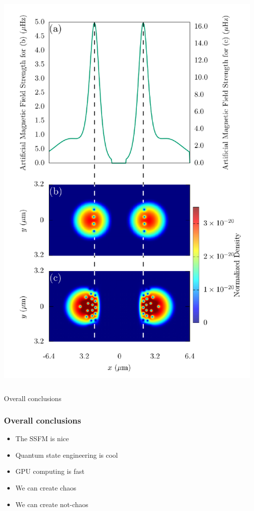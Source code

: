 \documentclass{beamer}
\begin{document}
\begin{frame}
\begin{columns}
\includegraphics[width=\linewidth]{../data/3d/vortex_line_all.pdf}
\end{columns}
\end{frame}


\begin{frame}
\center \huge Overall conclusions
\end{frame}

\begin{frame}
\frametitle{Overall conclusions}

\begin{itemize}
\item The SSFM is nice
\item Quantum state engineering is cool
\item GPU computing is fast
\item We can create chaos
\item We can create not-chaos
\end{itemize}
\end{frame}
\end{document}
